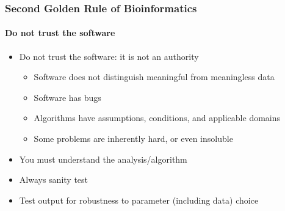 \documentclass[table]{beamer}
\begin{document}
%

  \begin{frame}
    \frametitle{Second Golden Rule of Bioinformatics}
    \framesubtitle{Do not trust the software}
	\begin{itemize}
	  \item Do not trust the software: it is not an authority
	  \begin{itemize}
	    \item Software does not distinguish meaningful from meaningless data
	    \item Software has bugs
	    \item Algorithms have assumptions, conditions, and applicable domains
	    \item Some problems are inherently hard, or even insoluble
	  \end{itemize}
	  \item You must understand the analysis/algorithm
	  \item Always sanity test
	  \item Test output for robustness to parameter (including data) choice
	\end{itemize}
  \end{frame}
\end{document}
